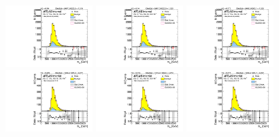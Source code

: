 \begin{figure}[htbp!]
\begin{center}
\includegraphics[angle=270, width=0.3\textwidth]{./figures/boosted/AppendixResveto/Moriond_TwoTag_split_Control_mHH_l.pdf}
\includegraphics[angle=270, width=0.3\textwidth]{./figures/boosted/AppendixResveto/Moriond_resveto_TwoTag_split_Control_mHH_l.pdf}
\includegraphics[angle=270, width=0.3\textwidth]{./figures/boosted/AppendixResveto/Moriond_fullresveto_TwoTag_split_Control_mHH_l.pdf}\\
\includegraphics[angle=270, width=0.3\textwidth]{./figures/boosted/AppendixResveto/Moriond_ThreeTag_Control_mHH_l.pdf}
\includegraphics[angle=270, width=0.3\textwidth]{./figures/boosted/AppendixResveto/Moriond_resveto_ThreeTag_Control_mHH_l.pdf}
\includegraphics[angle=270, width=0.3\textwidth]{./figures/boosted/AppendixResveto/Moriond_fullresveto_ThreeTag_Control_mHH_l.pdf}\\

\end{center}
\end{figure}
